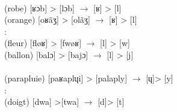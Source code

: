 \documentclass[output=paper,newtxmath,modfonts,nonflat,draftmode]{langsci/langscibook}
\begin{document}
\ex{}\\
(robe) [ʁɔb] > [lɔb] $\rightarrow$ [ʁ] > [l]\\ 
(orange) [oʁãʒ] > [olãʒ] $\rightarrow$ [ʁ] > [l]\\

\ex{}:\\
(fleur) [fløʁ] > [fwøʁ] $\rightarrow$ [l] > [w]\\ 
(ballon) [balɔ] > [bajɔ] $\rightarrow$ [l] > [j]\\

\ex{}\\
(parapluie) [paʁaplɥi] > [palaply] $\rightarrow$ [ɥ]> [y]\\

\ex{}:\\
(doigt) [dwa] >[twa] $\rightarrow$ [d]> [t]\\
\z
\z


\end{document}
